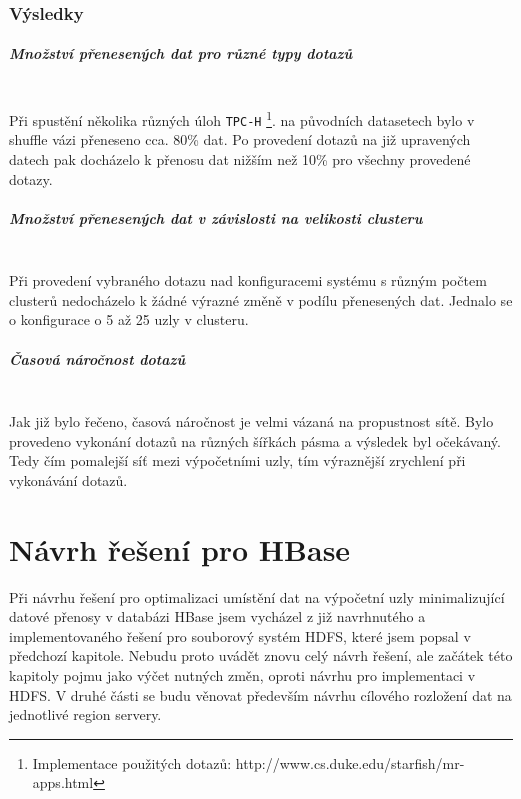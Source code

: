 \documentclass[thesis=M,czech]{FITthesis}[2012/06/26]
\begin{document}
\subsection{Výsledky}

\paragraph{Množství přenesených dat pro různé typy dotazů} \hfill \\
 Při spustění několika různých úloh \texttt{TPC-H} \footnote{Implementace použitých dotazů: http://www.cs.duke.edu/starfish/mr-apps.html}.  na původních datasetech bylo v shuffle vázi přeneseno cca. 80\% dat. Po provedení dotazů na již upravených datech pak docházelo k přenosu dat  nižším než 10\% pro všechny provedené dotazy.

\paragraph{Množství přenesených dat v závislosti na velikosti clusteru} \hfill \\
Při provedení vybraného dotazu nad konfiguracemi systému s různým počtem clusterů nedocházelo k žádné výrazné změně v podílu přenesených dat. Jednalo se o konfigurace o 5 až 25 uzly v clusteru.

\paragraph{Časová náročnost dotazů} \hfill \\
Jak již bylo řečeno, časová náročnost je velmi vázaná na propustnost sítě. Bylo provedeno vykonání dotazů na různých šířkách pásma a výsledek byl očekávaný. Tedy čím pomalejší síť mezi výpočetními uzly, tím výraznější zrychlení při vykonávání dotazů.






\chapter{Návrh řešení pro HBase}
Při návrhu řešení pro optimalizaci umístění dat na výpočetní uzly minimalizující datové přenosy v databázi HBase jsem vycházel z již navrhnutého a implementovaného řešení pro souborový systém HDFS, které jsem popsal v předchozí kapitole. Nebudu proto uvádět znovu celý návrh řešení, ale začátek této kapitoly pojmu jako výčet nutných změn, oproti návrhu pro implementaci v HDFS. V druhé části se budu věnovat především návrhu cílového rozložení dat na jednotlivé region servery.
\end{document}
